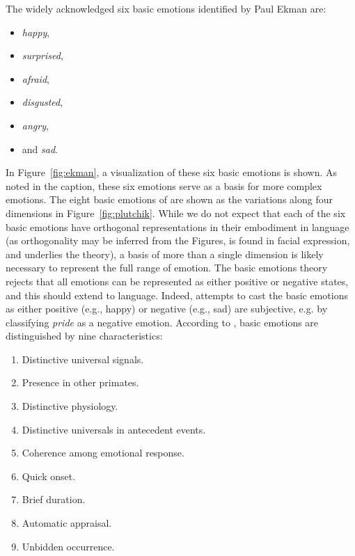 The widely acknowledged six basic emotions identified by Paul Ekman are:
{
\begin{itemize}
\item \textit{happy},\vspace{-12pt}
  \item \textit{surprised},\vspace{-12pt}
  \item \textit{afraid},\vspace{-12pt}
  \item \textit{disgusted},\vspace{-12pt}
  \item \textit{angry},\vspace{-12pt}
  \item and \textit{sad}.
\end{itemize}
}
In Figure~\ref{fig:ekman}, a visualization of these six basic emotions is shown.
As noted in the caption, these six emotions serve as a basis for more complex emotions.
The eight basic emotions of \cite{plutchik1991emotions} are shown as the variations along four dimensions in Figure~\ref{fig:plutchik}.
While we do not expect that each of the six basic emotions have orthogonal representations in their embodiment in language (as orthogonality may be inferred from the Figures, is found in facial expression, and underlies the theory), a basis of more than a single dimension is likely necessary to represent the full range of emotion.
The basic emotions theory rejects that all emotions can be represented as either positive or negative states, and this should extend to language.
Indeed, attempts to cast the basic emotions as either positive (e.g., happy) or negative (e.g., sad) are subjective, e.g. by \cite{robinson2008brain} classifying \textit{pride} as a negative emotion.
According to \cite{ekman1992argument}, basic emotions are distinguished by nine characteristics:
\begin{enumerate}
  \item Distinctive universal signals.\vspace{-12pt}
  \item Presence in other primates.\vspace{-12pt}
  \item Distinctive physiology.\vspace{-12pt}
  \item Distinctive universals in antecedent events.\vspace{-12pt}
  \item Coherence among emotional response.\vspace{-12pt}
  \item Quick onset.\vspace{-12pt}
  \item Brief duration.\vspace{-12pt}
  \item Automatic appraisal.\vspace{-12pt}
  \item Unbidden occurrence.
\end{enumerate}

